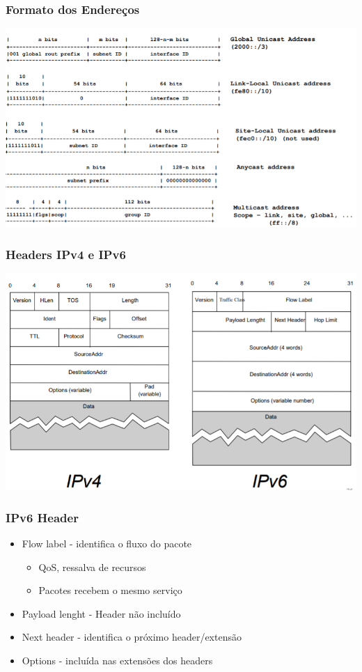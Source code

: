 \documentclass[../resumosRCOM.tex]{subfiles}
\begin{document}
\subsubsection{Formato dos Endereços}
\begin{center}
    \includegraphics[width=15cm]{images/RCOM36.png}
\end{center}

\subsubsection{Headers IPv4 e IPv6}
\begin{center}
    \includegraphics[width=14cm]{images/RCOM37.png}
\end{center}

\subsubsection{IPv6 Header}
\begin{itemize}
    \item Flow label - identifica o fluxo do pacote
    \begin{itemize}
        \item QoS, ressalva de recursos
        \item Pacotes recebem o mesmo serviço
    \end{itemize}
    \item Payload lenght - Header não incluído
    \item Next header - identifica o próximo header/extensão
    \item Options - incluída nas extensões dos headers
\end{itemize}
\end{document}
